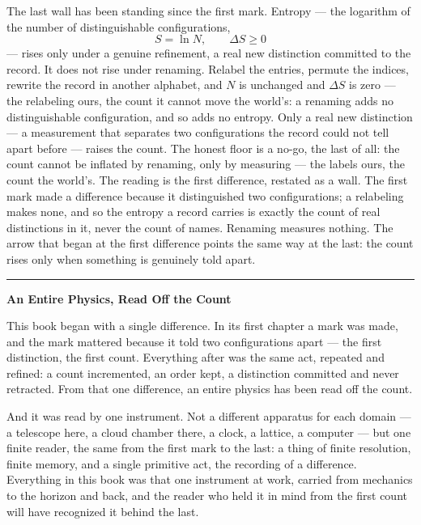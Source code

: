 The last wall has been standing since the first mark. Entropy --- the logarithm of the number of
distinguishable configurations,
\begin{equation}
  S = \ln N, \qquad \Delta S \ge 0
\end{equation}
--- rises only under a genuine refinement, a real new distinction committed to the record. It does not rise
under renaming. Relabel the entries, permute the indices, rewrite the record in another alphabet, and $N$ is
unchanged and $\Delta S$ is zero --- the relabeling ours, the count it cannot move the world's: a renaming
adds no distinguishable configuration, and so adds no entropy.
Only a real new distinction --- a measurement that separates two configurations the record could not tell apart
before --- raises the count. The honest floor is a no-go, the last of all: the count cannot be
inflated by renaming, only by measuring --- the labels ours, the count the world's. The reading is the first
difference, restated as a wall. The
first mark made a difference because it distinguished two configurations; a relabeling makes none, and so the
entropy a record carries is exactly the count of real distinctions in it, never the count of names. Renaming
measures nothing. The arrow that began at the first difference points the same way at the last: the count
rises only when something is genuinely told apart.

\bigskip
\begin{center}
\rule{0.4\textwidth}{0.4pt}
\end{center}
\bigskip

\noindent\textbf{\large An Entire Physics, Read Off the Count}

\medskip

This book began with a single difference. In its first chapter a mark was made, and the mark mattered because
it told two configurations apart --- the first distinction, the first count. Everything after was the same act,
repeated and refined: a count incremented, an order kept, a distinction committed and never retracted. From
that one difference, an entire physics has been read off the count.

And it was read by one instrument. Not a different apparatus for each domain --- a telescope here, a cloud
chamber there, a clock, a lattice, a computer --- but one finite reader, the same from the first mark to the
last: a thing of finite resolution, finite memory, and a single primitive act, the recording of a difference.
Everything in this book was that one instrument at work, carried from mechanics to the horizon and back, and
the reader who held it in mind from the first count will have recognized it behind the last.

